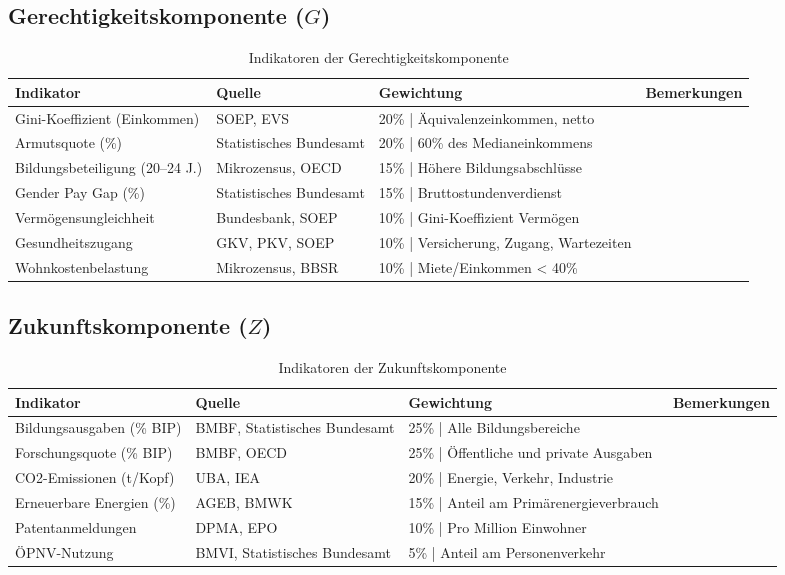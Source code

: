 \subsection{Gerechtigkeitskomponente (\(G\))}

\begin{table}[ht]
    \centering
    \caption{Indikatoren der Gerechtigkeitskomponente}
    \label{tab:indikatoren_gerechtigkeit}
    \begin{tabular}{llll}
        \toprule
        \textbf{Indikator} & \textbf{Quelle} & \textbf{Gewichtung} & \textbf{Bemerkungen} \\
        \midrule
        Gini-Koeffizient (Einkommen) & SOEP, EVS & 20\% | Äquivalenzeinkommen, netto \\
        Armutsquote (\%) & Statistisches Bundesamt & 20\% | 60\% des Medianeinkommens \\
        Bildungsbeteiligung (20–24 J.) & Mikrozensus, OECD & 15\% | Höhere Bildungsabschlüsse \\
        Gender Pay Gap (\%) & Statistisches Bundesamt & 15\% | Bruttostundenverdienst \\
        Vermögensungleichheit & Bundesbank, SOEP & 10\% | Gini-Koeffizient Vermögen \\
        Gesundheitszugang & GKV, PKV, SOEP & 10\% | Versicherung, Zugang, Wartezeiten \\
        Wohnkostenbelastung & Mikrozensus, BBSR & 10\% | Miete/Einkommen < 40\% \\
        \bottomrule
    \end{tabular}
\end{table}

\subsection{Zukunftskomponente (\(Z\))}

\begin{table}[ht]
    \centering
    \caption{Indikatoren der Zukunftskomponente}
    \label{tab:indikatoren_zukunft}
    \begin{tabular}{llll}
        \toprule
        \textbf{Indikator} & \textbf{Quelle} & \textbf{Gewichtung} & \textbf{Bemerkungen} \\
        \midrule
        Bildungsausgaben (\% BIP) & BMBF, Statistisches Bundesamt & 25\% | Alle Bildungsbereiche \\
        Forschungsquote (\% BIP) & BMBF, OECD & 25\% | Öffentliche und private Ausgaben \\
        CO2-Emissionen (t/Kopf) & UBA, IEA & 20\% | Energie, Verkehr, Industrie \\
        Erneuerbare Energien (\%) & AGEB, BMWK & 15\% | Anteil am Primärenergieverbrauch \\
        Patentanmeldungen & DPMA, EPO & 10\% | Pro Million Einwohner \\
        ÖPNV-Nutzung & BMVI, Statistisches Bundesamt & 5\% | Anteil am Personenverkehr \\
        \bottomrule
    \end{tabular}
\end{table}

